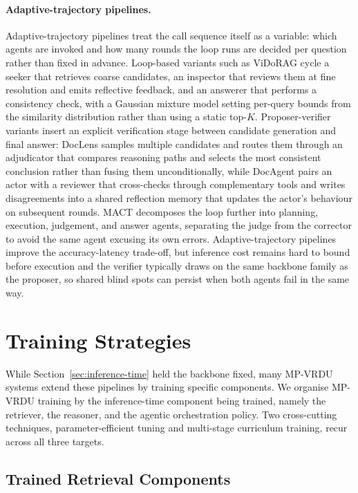 \documentclass[11pt]{article}
\begin{document}
\paragraph{Adaptive-trajectory pipelines.} Adaptive-trajectory pipelines treat the call sequence itself as a variable: which agents are invoked and how many rounds the loop runs are decided per question rather than fixed in advance. Loop-based variants such as ViDoRAG \cite{wang2025vidorag} cycle a seeker that retrieves coarse candidates, an inspector that reviews them at fine resolution and emits reflective feedback, and an answerer that performs a consistency check, with a Gaussian mixture model setting per-query bounds from the similarity distribution rather than using a static top-$K$. Proposer-verifier variants insert an explicit verification stage between candidate generation and final answer: DocLens \cite{zhu2025doclens} samples multiple candidates and routes them through an adjudicator that compares reasoning paths and selects the most consistent conclusion rather than fusing them unconditionally, while DocAgent \cite{sun2025docagent} pairs an actor with a reviewer that cross-checks through complementary tools and writes disagreements into a shared reflection memory that updates the actor's behaviour on subsequent rounds. MACT \cite{yu2025visual} decomposes the loop further into planning, execution, judgement, and answer agents, separating the judge from the corrector to avoid the same agent excusing its own errors. Adaptive-trajectory pipelines improve the accuracy-latency trade-off, but inference cost remains hard to bound before execution and the verifier typically draws on the same backbone family as the proposer, so shared blind spots can persist when both agents fail in the same way.

\section{Training Strategies}
\label{sec:training}

While Section~\ref{sec:inference-time} held the backbone fixed, many MP-VRDU systems extend these pipelines by training specific components. We organise MP-VRDU training by the inference-time component being trained, namely the retriever, the reasoner, and the agentic orchestration policy. Two cross-cutting techniques, parameter-efficient tuning and multi-stage curriculum training, recur across all three targets.

\subsection{Trained Retrieval Components}
\label{sec:train-retrieval}
\end{document}

